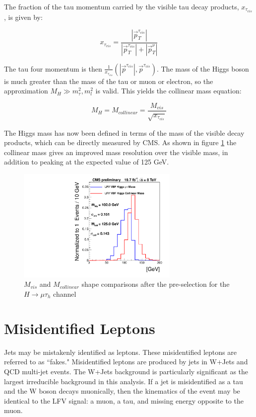 \documentclass[oneside, letterpaper, oldfontcommands]{memoir}
\begin{document}
The fraction of the tau momentum carried by the visible tau decay products, $x_{\tau_{vis}}$, is given by:

\begin{equation}
x_{\tau_{vis}} = \frac{|\vec{p}_{T}^{\tau_{vis}}|}{|\vec{p}_{T}^{\tau_{vis}}| + |\vec{p}_{T}^{\nu}|}
\end{equation}

The tau four momentum is then $\frac{1}{x_{\tau_{vis}}}\left(|\vec{p}^{\tau_{vis}}|,\vec{p}^{\tau_{vis}}\right)$. The mass of the Higgs boson is much greater than the mass of the tau or muon or electron, so the approximation $M_{H} \gg m_{\tau}^2,m_{l}^2$ is valid. This yields the collinear mass equation:

\begin{equation} 
M_{H} = M_{collinear} = \frac{M_{vis}}{\sqrt{x_{\tau_{vis}}}}
\end{equation}

The Higgs mass has now been defined in terms of the mass of the visible decay products, which can be directly measured by CMS. As shown in figure \ref{fig:MvisMcol} the collinear mass gives an improved mass resolution over the visible mass, in addition to peaking at the expected value of 125 GeV. 

\begin{figure}[hbtp]\begin{center}
\includegraphics[height=5.5cm]{masses_muhad_VBF_After_Presel_signal.pdf}
 \caption{$M_{vis}$  and $M_{collinear}$  shape comparisons after the pre-selection for the $H \rightarrow \mu\tau_{h}$ channel}
 \label{fig:MvisMcol}\end{center}\end{figure}
 
\section{Misidentified Leptons}\label{fakes}
\qquad Jets may be mistakenly identified as leptons. These misidentified leptons are referred to as ``fakes." Misidentified leptons are produced by jets in W+Jets and QCD multi-jet events. The W+Jets background is particularly significant as the largest irreducible background in this analysis. If a jet is misidentified as a tau and the W boson decays muonically, then the kinematics of the event may be identical to the LFV signal: a muon, a tau, and missing energy opposite to the muon. 
\end{document}
